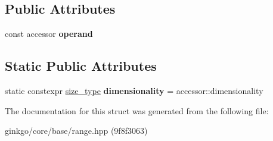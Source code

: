 \subsection*{Public Attributes}
\begin{DoxyCompactItemize}
\item 
\mbox{\label{structgko_1_1accessor_1_1transpose__operation_a2b4c2d5172d31e787f8d4965251743b3}} 
const accessor {\bfseries operand}
\end{DoxyCompactItemize}
\subsection*{Static Public Attributes}
\begin{DoxyCompactItemize}
\item 
\mbox{\label{structgko_1_1accessor_1_1transpose__operation_aee04484bec2b33a04e2482077a5925a5}} 
static constexpr \hyperlink{namespacegko_a6e5c95df0ae4e47aab2f604a22d98ee7}{size\+\_\+type} {\bfseries dimensionality} = accessor\+::dimensionality
\end{DoxyCompactItemize}


The documentation for this struct was generated from the following file\+:\begin{DoxyCompactItemize}
\item 
ginkgo/core/base/range.\+hpp (9f8f3063)\end{DoxyCompactItemize}
